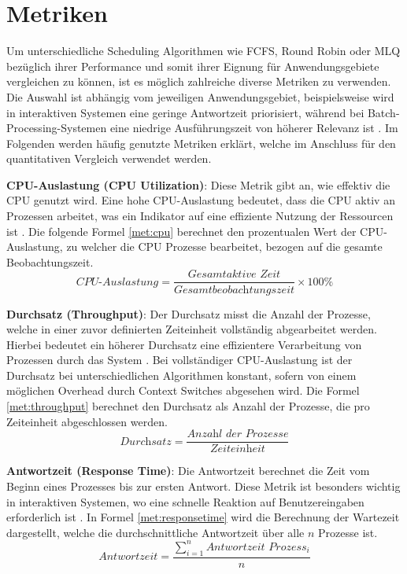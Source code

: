 
\section{Metriken}
Um unterschiedliche Scheduling Algorithmen wie \ac{FCFS}, Round Robin oder \ac{MLQ} bezüglich ihrer Performance und somit ihrer Eignung für Anwendungsgebiete vergleichen zu können, ist es möglich zahlreiche diverse Metriken zu verwenden. Die Auswahl ist abhängig vom jeweiligen Anwendungsgebiet, beispielsweise wird in interaktiven Systemen eine geringe Antwortzeit priorisiert, während bei Batch-Processing-Systemen eine niedrige Ausführungszeit von höherer Relevanz ist \autocite{thombare_efficient_2016}. Im Folgenden werden häufig genutzte Metriken erklärt, welche im Anschluss für den quantitativen Vergleich verwendet werden.


\textbf{\ac{CPU}-Auslastung (\ac{CPU} Utilization)}: Diese Metrik gibt an, wie effektiv die \ac{CPU} genutzt wird. Eine hohe \ac{CPU}-Auslastung bedeutet, dass die \ac{CPU} aktiv an Prozessen arbeitet, was ein Indikator auf eine effiziente Nutzung der Ressourcen ist \autocite{pemasinghe_comparison_2022}. Die folgende Formel \ref{met:cpu} berechnet den prozentualen Wert der \ac{CPU}-Auslastung, zu welcher die \ac{CPU} Prozesse bearbeitet, bezogen auf die gesamte Beobachtungszeit.
\begin{equation}
	\textit{CPU-Auslastung} = \frac{\textit{Gesamtaktive Zeit}}{\textit{Gesamtbeobachtungszeit}} \times 100\%
	\label{met:cpu}
\end{equation}


\textbf{Durchsatz (Throughput)}: Der Durchsatz misst die Anzahl der Prozesse, welche in einer zuvor definierten Zeiteinheit vollständig abgearbeitet werden. Hierbei bedeutet ein höherer Durchsatz eine effizientere Verarbeitung von Prozessen durch das System  \autocite{pemasinghe_comparison_2022}. Bei vollständiger \ac{CPU}-Auslastung ist der Durchsatz bei unterschiedlichen Algorithmen konstant, sofern von einem möglichen Overhead durch Context Switches abgesehen wird. Die Formel \ref{met:throughput} berechnet den Durchsatz als Anzahl der Prozesse, die pro Zeiteinheit abgeschlossen werden.
\begin{equation}
	\textit{Durchsatz} = \frac{\textit{Anzahl\ der\ Prozesse}}{\textit{Zeiteinheit}}
	\label{met:throughput}
\end{equation}


\textbf{Antwortzeit (Response Time)}: Die Antwortzeit berechnet die Zeit vom Beginn eines Prozesses bis zur ersten Antwort. Diese Metrik ist besonders wichtig in interaktiven Systemen, wo eine schnelle Reaktion auf Benutzereingaben erforderlich ist  \autocite{pemasinghe_comparison_2022}. In Formel \ref{met:responsetime} wird die Berechnung der Wartezeit dargestellt, welche die durchschnittliche Antwortzeit über alle \( n \) Prozesse ist.
\begin{equation}
	\textit{Antwortzeit} = \frac{\sum_{i=1}^{n} \textit{Antwortzeit Prozess}_{i}}{n}
	\label{met:responsetime}
\end{equation}


